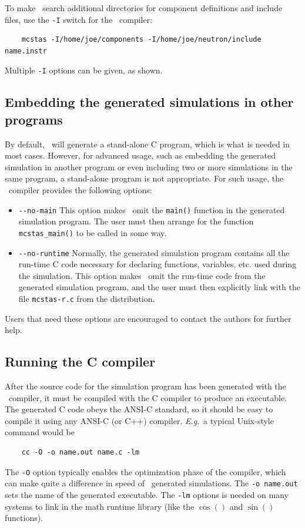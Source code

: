 To make \MCS\ search additional directories for component definitions
and include files, use the \verb+-I+ switch for the \MCS\ compiler:
\begin{verbatim}
    mcstas -I/home/joe/components -I/home/joe/neutron/include name.instr
\end{verbatim}
Multiple \verb+-I+ options can be given, as shown.


\subsection{Embedding the generated simulations in other programs}

By default, \MCS\ will generate a stand-alone C program, which is what
is needed in most cases. However, for advanced usage, such as embedding
the generated simulation in another program or even including two or
more simulations in the same program, a stand-alone program is not
appropriate. For such usage, the \MCS\ compiler provides the following
options:
\begin{itemize}
\item \verb+--no-main+ This option makes \MCS\ omit the \verb+main()+
  function in the generated simulation program. The user must then
  arrange for the function \verb+mcstas_main()+ to be called in some
  way.
\item \verb+--no-runtime+ Normally, the
  generated simulation program contains all the run-time C code necessary for
  declaring functions, variables, etc. used during the simulation.  This
  option makes \MCS\ omit the run-time code from the generated
  simulation program, and the user must then explicitly link with the file
  \verb+mcstas-r.c+ from the \MCS{} distribution. 
\end{itemize}
Users that need these options are encouraged to contact the authors for
further help.


\subsection{Running the C compiler}


After the source code for the simulation program has been generated with
the \MCS\ compiler, it must be compiled with the C compiler to produce
an executable. The generated C code obeys the ANSI-C standard, so it
should be easy to compile it using any ANSI-C (or C++) compiler. \textit{E.g}.\ a
typical Unix-style command would be
\begin{verbatim}
    cc -O -o name.out name.c -lm
\end{verbatim}
The \verb+-O+ option typically enables the optimization phase of the compiler,
which can make quite a difference in speed of \MCS\ generated simulations. The
\verb+-o name.out+ sets the name of the generated executable. The \verb+-lm+
options is needed on many systems to link in the math runtime library (like the
$\cos()$ and $\sin()$ functions).

